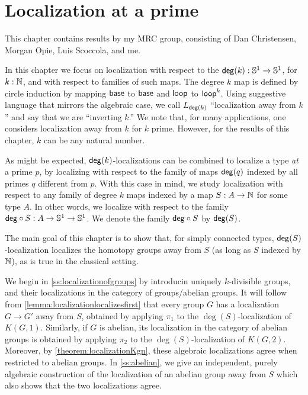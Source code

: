 \chapter{Localization at a prime}\label{chap:prime}

This chapter contains results by my MRC group, consisting of Dan Christensen, Morgan Opie, Luis Scoccola, and me.

In this chapter we focus on localization with respect to the  $\mathsf{deg}(k) : \mathbb{S}^{1} \to \mathbb{S}^{1}$, for $k : \mathbb{N}$, and with respect to
families of such maps.
The degree $k$ map is defined by circle induction by mapping $\mathsf{base}$ to $\mathsf{base}$
and $\mathsf{loop}$ to $\mathsf{loop}^k$.
Using suggestive language that mirrors the algebraic case, we call $L_{\mathsf{deg}(k)}$
``localization away from $k$'' and say that we are ``inverting $k$.''
We note that, for many applications, one considers localization away from $k$ for $k$ prime.
However, for the results of this chapter, $k$ can be any natural number.

As might be expected, $\mathsf{deg}(k)$-localizations can be combined to localize a type \emph{at}
a prime $p$, by localizing with respect to the family of maps $\mathsf{deg}(q)$ indexed by all
primes $q$ different from $p$.
With this case in mind, we study localization with respect to any family of degree $k$ maps
indexed by a map $S : A \to \mathbb{N}$ for some type $A$.
In other words, we localize with respect to the family $\mathsf{deg}\circ S : A \to \mathbb{S}^{1} \to \mathbb{S}^{1}$.
We denote the family $\mathsf{deg}\circ S$ by $\mathsf{deg}(S)$.

The main goal of this chapter is to show that, for simply connected types,
$\mathsf{deg}(S)$-localization localizes the homotopy groups away from $S$ (as long as $S$ indexed by $\mathbb{N}$),
as is true in the classical setting.

We begin in \cref{ss:localizationofgroups} by introducin uniquely $k$-divisible groups, and their localizations in the category of groups/abelian groups. 
It will follow from \cref{lemma:localizationlocalizesfirst} that every group $G$ has a localization $G \to G'$
away from $S$, obtained by applying $\pi_1$ to the $\deg(S)$-localization of $K(G, 1)$.
Similarly, if $G$ is abelian, its localization in the category of abelian groups is obtained
by applying $\pi_2$ to the $\deg(S)$-localization of $K(G,2)$.
Moreover, by \cref{theorem:localizationKgn}, these algebraic localizations agree
when restricted to abelian groups.
In \cref{ss:abelian}, we give an independent, purely algebraic construction of
the localization of an abelian group away from $S$ which also shows that the
two localizations agree.

